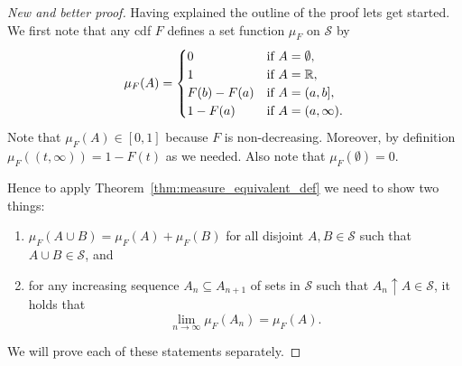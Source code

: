 \begin{proof}[New and better proof]
Having explained the outline of the proof lets get started. We first note that any cdf $F$ defines a set function $\mu_F$ on $\mathcal{S}$ by
\[
	\mu_F(A) = \begin{cases}
		0 &\text{if } A = \emptyset,\\
		1 &\text{if } A = \mathbb R,\\
		F(b) - F(a) &\text{if } A = (a,b],\\
		1 - F(a) &\text{if } A = (a, \infty).
	\end{cases}
\]
Note that $\mu_F(A) \in [0,1]$ because $F$ is non-decreasing. Moreover, by definition $\mu_F((t,\infty)) = 1 - F(t)$ as we needed. Also note that $\mu_F(\emptyset) = 0$.


Hence to apply Theorem~\ref{thm:measure_equivalent_def} we need to show two things:
\begin{enumerate}
\item $\mu_F(A \cup B) = \mu_F(A) + \mu_F(B)$ for all disjoint $A,B \in \mathcal{S}$ such that $A \cup B \in \mathcal{S}$, and
\item for any increasing sequence $A_n \subseteq A_{n+1}$ of sets in $\mathcal{S}$ such that $A_n \uparrow A \in \mathcal{S}$, it holds that
\begin{equation}\label{eq:construction_rv_increasing_sequence}
	\lim_{n \to \infty} \mu_F(A_n) = \mu_F(A).
\end{equation}
\end{enumerate}

We will prove each of these statements separately.


\end{proof}
